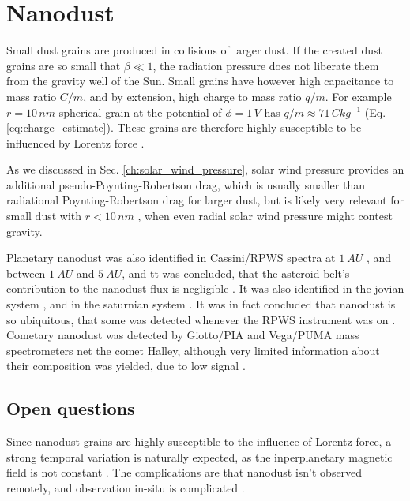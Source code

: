 \section{Nanodust}

Small dust grains are produced in collisions of larger dust. If the created dust grains are so small that $\beta \ll 1$, the radiation pressure does not liberate them from the gravity well of the Sun. Small grains have however high capacitance to mass ratio $C/m$, and by extension, high charge to mass ratio $q/m$. For example $r = 10 \, \si{nm}$ spherical grain at the potential of $\phi = 1 \, \si{V}$ has $q/m \approx 71 \, \si{Ckg^{-1}}$ (Eq. \ref{eq:charge_estimate}). These grains are therefore highly susceptible to be influenced by Lorentz force \citep{czechowski2010formation}. 

As we discussed in Sec. \ref{ch:solar_wind_pressure}, solar wind pressure provides an additional pseudo-Poynting-Robertson drag, which is usually smaller than radiational Poynting-Robertson drag for larger dust, but is likely very relevant for small dust with $r<10\, \si{nm}$ \citep{mukai1982solar}, when even radial solar wind pressure might contest gravity. 

Planetary nanodust was also identified in Cassini/RPWS spectra 
at $\SI{1}{AU}$ \citep{schippers2014nanodust}, and  between $\SI{1}{AU}$ and $\SI{5}{AU}$, and tt was concluded, that the asteroid belt's contribution to the nanodust flux is negligible \citep{schippers2015nanodust}. It was also identified in the jovian system \citep{meyer2009detecting}, and in the saturnian system \citep{kempf2005high}. It was in fact concluded that nanodust is so ubiquitous, that some was detected whenever the RPWS instrument was on \citep{schippers2015nanodust}. Cometary nanodust was detected by Giotto/PIA and Vega/PUMA mass spectrometers net the comet Halley, although very limited information about their composition was yielded, due to low signal \cite{utterback1990attogram}.

\subsection{Open questions}

Since nanodust grains are highly susceptible to the influence of Lorentz force, a strong temporal variation is naturally expected, as the inperplanetary magnetic field is not constant \citep{poppe2020effects}. The complications are that nanodust isn't observed remotely, and observation in-situ is complicated \citep{pantellini2012nano,kellogg2016dust,kellogg2017note}. 

